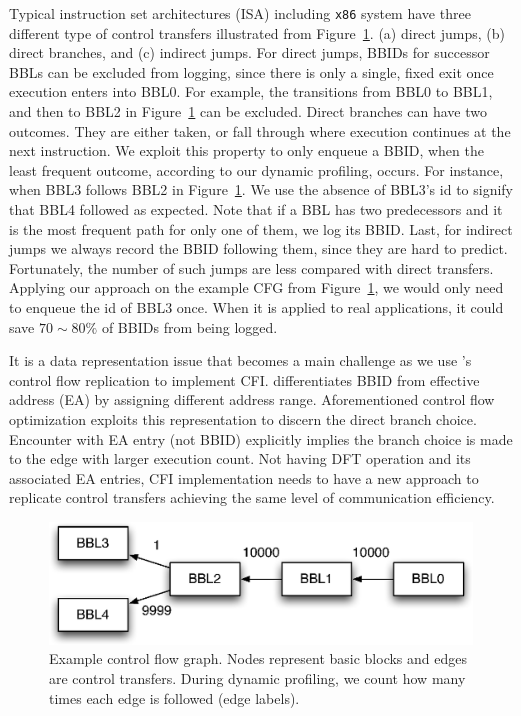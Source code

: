 Typical instruction set architectures (ISA) including {\tt x86} system have
three different type of control transfers illustrated from
Figure~\ref{fig:cfg0}. (a) direct jumps, (b) direct branches, and (c) indirect
jumps. For direct jumps, BBIDs for successor BBLs can be excluded from logging,
since there is only a single, fixed exit once execution enters into BBL0. For
example, the transitions from BBL0 to BBL1, and then to BBL2 in
Figure~\ref{fig:cfg0} can be excluded. Direct branches can have two outcomes.
They are either taken, or fall through where execution continues at the next
instruction. We exploit this property to only enqueue a BBID, when the least
frequent outcome, according to our dynamic profiling, occurs. For instance,
when BBL3 follows BBL2 in Figure~\ref{fig:cfg0}. We use the absence of BBL3’s
id to signify that BBL4 followed as expected. Note that if a BBL has two
predecessors and it is the most frequent path for only one of them, we log its
BBID. Last, for indirect jumps we always record the BBID following them, since
they are hard to predict.  Fortunately, the number of such jumps are less
compared with direct transfers.
%
Applying our approach on the example CFG from Figure~\ref{fig:cfg0}, we would
only need to enqueue the id of BBL3 once. When it is applied to real
applications, it could save $70 \sim 80 \%$ of BBIDs from being logged.

It is a data representation issue that becomes a main challenge as we use
\sreplica's control flow replication to implement CFI. \sreplica differentiates
BBID from effective address (EA) by assigning different address range.
Aforementioned control flow optimization exploits this representation to
discern the direct branch choice. Encounter with EA entry (not BBID) explicitly
implies the branch choice is made to the edge with larger execution count.
%
Not having DFT operation and its associated EA entries, CFI implementation
needs to have a new approach to replicate control transfers achieving the same
level of communication efficiency.

\begin{figure}[tb]
    \centering
    \includegraphics[width=0.64\linewidth]{figs/cfg0.eps}
    \caption{Example control flow graph. Nodes represent basic blocks and edges
    are control transfers. During dynamic profiling, we count how many times
    each edge is followed (edge labels). \label{fig:cfg0}}
\end{figure}


